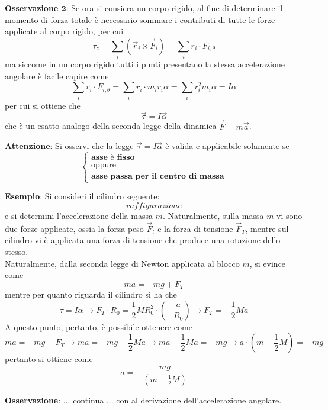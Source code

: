 \documentclass[a4paper]{extarticle}
\begin{document}
\vspace{1em}
\noindent
\textbf{Osservazione $\boldsymbol{2}$}: Se ora si consiera un corpo rigido, al fine di determinare il momento di forza totale è necessario sommare i contributi di tutte le forze applicate al corpo rigido, per cui
\[\tau_z=\sum_i \left(\vec r_i \times \vec F_i\right) = \sum_{i} r_i \cdot F_{i,\theta}\]
ma siccome in un corpo rigido tutti i punti presentano la stessa accelerazione angolare è facile capire come
\[\sum_{i} r_i \cdot F_{i,\theta} = \sum_{i} r_i \cdot m_i r_i \alpha = \sum_{i} r_i^2 m_i \alpha = I \alpha\]
per cui si ottiene che
\[\boxed{\vec \tau = I \vec \alpha}\]
che è un esatto analogo della seconda legge della dinamica $\vec F = m \vec a$.

\vspace{1em}
\noindent
\textbf{Attenzione}: Si osservi che la legge $\vec \tau = I \vec \alpha$ è valida e applicabile solamente se
\[\left\{
    \begin{array}{l}
      \textbf{asse è fisso}\\
      \text{oppure}\\
      \textbf{asse passa per il centro di massa}
    \end{array}
\right.\]

\vspace{1em}
\noindent
\textbf{Esempio}: Si consideri il cilindro seguente:
\[raffigurazione\]
e si determini l'accelerazione della massa $m$. Naturalmente, sulla massa $m$ vi sono due forze applicate, ossia la forza peso $\vec F_t$ e la forza di tensione $\vec F_T$, mentre sul cilindro vi è applicata una forza di tensione che produce una rotazione dello stesso.\\
Naturalmente, dalla seconda legge di Newton applicata al blocco $m$, si evince come
\[ma = -mg + F_T\]
mentre per quanto riguarda il cilindro si ha che
\[\tau = I \alpha \longrightarrow F_T \cdot R_0 = \frac{1}{2}M R_0^2 \cdot \left(-\frac{a}{R_0}\right) \longrightarrow F_T = -\frac{1}{2}M a\]
A questo punto, pertanto, è possibile ottenere come
\[ma = -mg + F_T \longrightarrow ma=-mg+\frac{1}{2}Ma \longrightarrow ma-\frac{1}{2}Ma=-mg \longrightarrow a \cdot \left(m-\frac{1}{2}M\right)=-mg\]
pertanto si ottiene come
\[a=-\frac{mg}{\displaystyle{\left(m-\frac{1}{2}M\right)}}\]

\vspace{1em}
\noindent
\textbf{Osservazione}: ... continua ... con al derivazione dell'accelerazione angolare.

\vspace{1em}
\end{document}
